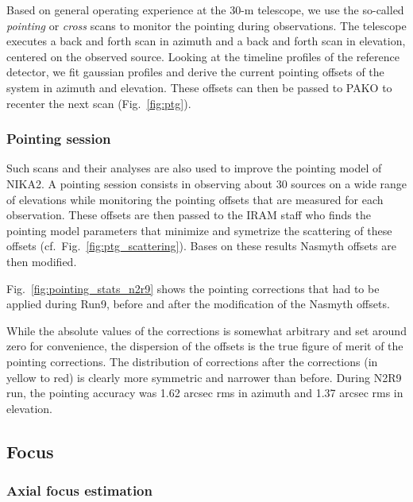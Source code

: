 Based on general operating experience at the 30-m telescope, we use the so-called
{\em pointing} or {\em cross} scans to monitor the pointing during observations. The
telescope executes a back and forth scan in azimuth and a back and forth scan in
elevation, centered on the observed source. Looking at the timeline profiles of
the reference detector, we fit gaussian profiles and derive the current pointing
offsets of the system in azimuth and elevation. These offsets can then be passed
to PAKO to recenter the next scan (Fig.~\ref{fig:ptg}).

\subsubsection{Pointing session}
Such scans and their analyses are also used to improve the pointing
model of NIKA2. A pointing session consists in observing about 30
sources on a wide range of elevations while monitoring the pointing
offsets that are measured for each observation. These offsets are then
passed to the IRAM staff who finds the pointing model parameters that
minimize and symetrize the scattering of these offsets
(cf.~Fig.~\ref{fig:ptg_scattering}). Bases on these results Nasmyth
offsets are then modified.


Fig.~\ref{fig:pointing_stats_n2r9} shows
the pointing corrections that had to be applied during Run9, before and after
the modification of the Nasmyth offsets. 


While the absolute values of the
corrections is somewhat arbitrary and set around zero for convenience, the
dispersion of the offsets is the true figure of merit of the pointing
corrections. The distribution of corrections after the corrections (in yellow to
red) is clearly more symmetric and narrower than before. During N2R9 run, the pointing accuracy was
1.62 arcsec rms in azimuth and 1.37 arcsec rms in elevation.




\subsection{Focus}


\subsubsection{Axial focus estimation}
\label{sec:focus-meas}

